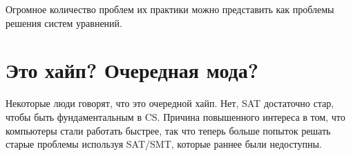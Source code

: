 Огромное количество проблем их практики можно представить как проблемы решения систем уравнений.

\section{Это хайп? Очередная мода?}

Некоторые люди говорят, что это очередной хайп.
Нет, \ac{SAT} достаточно стар, чтобы быть фундаментальным в \ac{CS}.
Причина повышенного интереса в том, что компьютеры стали работать быстрее,
так что теперь больше попыток решать старые проблемы используя 
\ac{SAT}/\ac{SMT}, которые раннее были недоступны.

